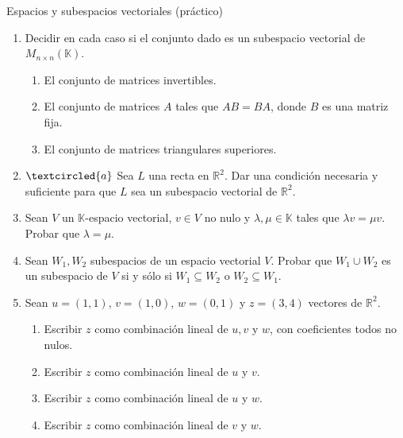 \begin{chapter}{Espacios y subespacios vectoriales (práctico)}
\begin{enumerate}[resume, topsep=6pt, itemsep=.4cm]
\item\label{sub matrices} Decidir en cada caso si el conjunto dado es un subespacio vectorial de $M_{n\times n}(\mathbb{K})$.
\begin{enumerate}
    \item\label{sub matrices invertibles} El conjunto de matrices  invertibles.
    \item\label{sub matrices AB} El conjunto de matrices $A$ tales que $AB = BA$, donde $B$ es una matriz fija.
    \item\label{sub matrices triangulares} El conjunto de matrices triangulares superiores.
\end{enumerate}


\item\label{rectas} $\textcircled{a}$ Sea $L$ una recta en $\mathbb{R}^2$. Dar una condición necesaria y suficiente para que $L$ sea un subespacio vectorial de $\mathbb{R}^2$.


\item Sean $V$ un $\mathbb{K}$-espacio vectorial, $v\in V$ no nulo y $\lambda,\mu\in\mathbb{K}$ tales que $\lambda v=\mu v$. Probar que $\lambda=\mu$.


\item Sean $W_1, W_2$ subespacios de un espacio vectorial $V$. Probar que $W_1 \cup W_2$ es un subespacio
    de $V$ si y sólo si $W_1 \subseteq W_2$ o $W_2 \subseteq W_1$.
    

\item Sean $u=(1,1)$, $v=(1,0)$, $w=(0,1)$ y $z=(3,4)$ vectores de $\mathbb{R}^2$.
\begin{enumerate}
\item Escribir $z$ como combinación lineal de $u,v$ y $w$, con coeficientes todos no nulos.
\item Escribir $z$ como combinación lineal de $u$ y $v$.
\item Escribir $z$ como combinación lineal de $u$ y $w$.
\item Escribir $z$ como combinación lineal de $v$ y $w$.
\end{enumerate}


\end{enumerate}
\end{chapter}
